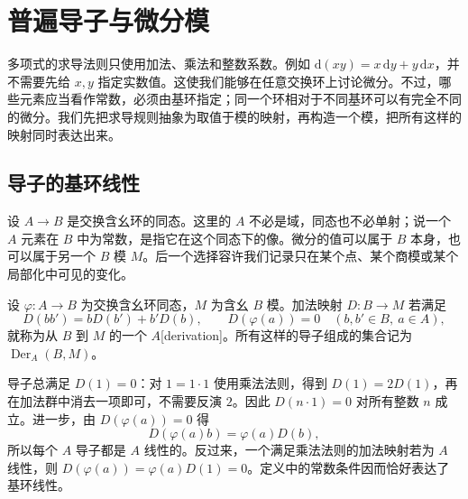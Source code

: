 
% 
% 

\section{普遍导子与微分模}
\label{g5:sec:0501}

多项式的求导法则只使用加法、乘法和整数系数。例如 \(\mathrm{d}(xy)=x\,\mathrm{d}y+y\,\mathrm{d}x\)，并不需要先给 \(x,y\) 指定实数值。这使我们能够在任意交换环上讨论微分。不过，哪些元素应当看作常数，必须由基环指定；同一个环相对于不同基环可以有完全不同的微分。我们先把求导规则抽象为取值于模的映射，再构造一个模，把所有这样的映射同时表达出来。

\subsection{导子的基环线性}
\label{g5:subsec:0501:01}

设 \(A\to B\) 是交换含幺环的同态。这里的 \(A\) 不必是域，同态也不必单射；说一个 \(A\) 元素在 \(B\) 中为常数，是指它在这个同态下的像。微分的值可以属于 \(B\) 本身，也可以属于另一个 \(B\) 模 \(M\)。后一个选择容许我们记录只在某个点、某个商模或某个局部化中可见的变化。

\begin{definition}\label{g5:def:derivation}
	设 \(\varphi:A\to B\) 为交换含幺环同态，\(M\) 为含幺 \(B\) 模。加法映射 \(D:B\to M\) 若满足
	\[
		D(bb')=bD(b')+b'D(b),\qquad
		D(\varphi(a))=0
		\quad(b,b'\in B,\ a\in A),
	\]
	就称为从 \(B\) 到 \(M\) 的一个 \(A\)[derivation]。所有这样的导子组成的集合记为 \(\operatorname{Der}_A(B,M)\)。
\end{definition}

导子总满足 \(D(1)=0\)：对 \(1=1\cdot1\) 使用乘法法则，得到 \(D(1)=2D(1)\)，再在加法群中消去一项即可，不需要反演 \(2\)。因此 \(D(n\cdot1)=0\) 对所有整数 \(n\) 成立。进一步，由 \(D(\varphi(a))=0\) 得
\[
	D(\varphi(a)b)=\varphi(a)D(b),
\]
所以每个 \(A\) 导子都是 \(A\) 线性的。反过来，一个满足乘法法则的加法映射若为 \(A\) 线性，则 \(D(\varphi(a))=\varphi(a)D(1)=0\)。定义中的常数条件因而恰好表达了基环线性。

\ProseParagraphBreak


